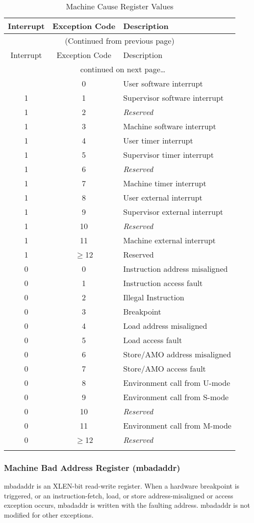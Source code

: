 \begin{longtable}[]{@{}ccl@{}}
\toprule
Interrupt & Exception Code & Description\tabularnewline
\midrule
\endfirsthead
\multicolumn{3}{c}{{(Continued from previous page)}} \\

\toprule
Interrupt & Exception Code & Description\tabularnewline
\midrule
\endhead

\midrule \multicolumn{3}{c}{{\tablename\ \thetable{} continued on next page\ldots}} \\
\endfoot

\endlastfoot
1 & 0 & User software interrupt\tabularnewline
1 & 1 & Supervisor software interrupt\tabularnewline
1 & 2 & \emph{Reserved}\tabularnewline
1 & 3 & Machine software interrupt\tabularnewline
1 & 4 & User timer interrupt\tabularnewline
1 & 5 & Supervisor timer interrupt\tabularnewline
1 & 6 & \emph{Reserved}\tabularnewline
1 & 7 & Machine timer interrupt\tabularnewline
1 & 8 & User external interrupt\tabularnewline
1 & 9 & Supervisor external interrupt\tabularnewline
1 & 10 & \emph{Reserved}\tabularnewline
1 & 11 & Machine external interrupt\tabularnewline
1 & $\geqslant$12 & Reserved\tabularnewline
\midrule
0 & 0 & Instruction address misaligned\tabularnewline
0 & 1 & Instruction access fault\tabularnewline
0 & 2 & Illegal Instruction\tabularnewline
0 & 3 & Breakpoint\tabularnewline
0 & 4 & Load address misaligned\tabularnewline
0 & 5 & Load access fault\tabularnewline
0 & 6 & Store/AMO address misaligned\tabularnewline
0 & 7 & Store/AMO access fault\tabularnewline
0 & 8 & Environment call from U-mode\tabularnewline
0 & 9 & Environment call from S-mode\tabularnewline
0 & 10 & \emph{Reserved}\tabularnewline
0 & 11 & Environment call from M-mode\tabularnewline
0 & $\geqslant$12 & \emph{Reserved}\tabularnewline
\bottomrule
\caption{Machine Cause Register Values}
\label{tab:mcause-reg-values}
\end{longtable}


\subsubsection{Machine Bad Address Register
(mbadaddr)}\label{machine-bad-address-register-mbadaddr}

mbadaddr is an XLEN-bit read-write register. When a hardware breakpoint
is triggered, or an instruction-fetch, load, or store address-misaligned
or access exception occurs, mbadaddr is written with the faulting
address. mbadaddr is not modified for other exceptions.

